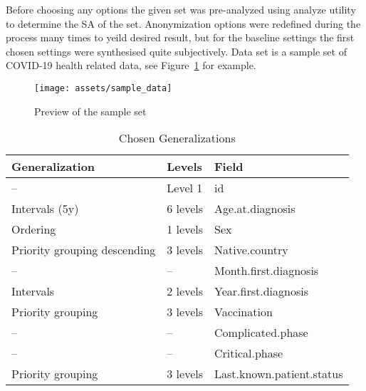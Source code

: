 

Before choosing any options the given set was pre-analyzed using analyze utility to determine the \ac{SA} of the set.
Anonymization options were redefined during the process many times to yeild desired result, but for the baseline settings the first chosen
settings were synthesised quite subjectively. Data set is a sample set of COVID-19 health related data, see Figure~\ref{fig:my_label3}
for example.

\begin{figure}[ht]
  \centering
  \texttt{[image: assets/sample\_data]}
  \caption{Preview of the sample set}
  \label{fig:my_label3}
\end{figure}

\begin{table}[ht]
  \small
  \centering
  \caption{Chosen Generalizations}
  \begin{tabular}{lll}
    \toprule
    \textbf{Generalization}      & \textbf{Levels} & \textbf{Field}            \\
    \midrule
    --                           & Level 1         & id                        \\
    Intervals (5y)               & 6 levels        & Age.at.diagnosis          \\
    Ordering                     & 1 levels        & Sex                       \\
    Priority grouping descending & 3 levels        & Native.country            \\
    --                           & --              & Month.first.diagnosis     \\
    Intervals                    & 2 levels        & Year.first.diagnosis      \\
    Priority grouping            & 3 levels        & Vaccination               \\
    --                           & --              & Complicated.phase         \\
    --                           & --              & Critical.phase            \\
    Priority grouping            & 3 levels        & Last.known.patient.status \\
    \bottomrule
  \end{tabular}\label{tab:table2}
\end{table}


